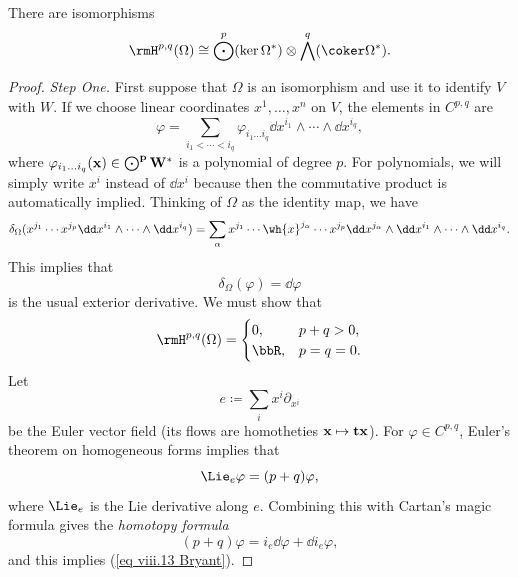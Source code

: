 \begin{prop}
    There are isomorphisms
    \[\rmH^{p,q}(\Omega)\cong \bigodot^p(\ker \Omega^\ast)\otimes \bigwedge^q(\coker\Omega^\ast).\]
\end{prop}
\begin{proof}
    \emph{Step One.} First suppose that $\Omega$ is an isomorphism and use it to identify $V$ with $W$. If we choose linear coordinates $x^1,\ldots,x^n$ on $V$, the elements in $C^{p,q}$ are 
    \[\varphi=\sum_{i_1<\cdots<i_q}\varphi_{i_1\ldots i_q}\dd x^{i_1}\wedge\cdots\wedge\dd x^{i_q},\]
    where $\varphi_{i_1\ldots i_q}(\bf{x})\in \bigodot^p W^\ast$ is a polynomial of degree $p$. For polynomials, we will simply write $x^i$ instead of $\dd x^i$ because then the commutative product is automatically implied. Thinking of $\Omega$ as the identity map, we have 
    \[\delta_\Omega(x^{j_1}\cdots x^{j_p}\dd x^{i_1}\wedge\cdots\wedge\dd x^{i_q})=\sum_\alpha x^{j_1}\cdots \wh{x}^{j_\alpha}\cdots x^{j_p}\dd x^{j_\alpha}\wedge \dd x^{i_1}\wedge\cdots \wedge\dd x^{i_q}.\]
    This implies that
    \[\delta_\Omega(\varphi)=\dd\varphi\]
    is the usual exterior derivative. We must show that 
    \[\rmH^{p,q}(\Omega)=\begin{cases}
        0, & p+q>0,\\
        \bbR, & p=q=0.
    \end{cases}\label{eq viii.13 Bryant}\]
    Let 
    \[e\coloneqq \sum_i x^i \partial_{x^i}\]
    be the Euler vector field (its flows are homotheties $\bf{x}\mapsto t\bf{x}$). For $\varphi\in C^{p,q}$, Euler's theorem on homogeneous forms implies that 
    \[\Lie_e \varphi=(p+q)\varphi,\]
    where $\Lie_e$ is the Lie derivative along $e$. Combining this with Cartan's magic formula gives the \emph{homotopy formula}
    \[(p+q)\varphi=i_e\dd\varphi+\dd i_e \varphi,\]
    and this implies (\ref{eq viii.13 Bryant}).


\end{proof}
